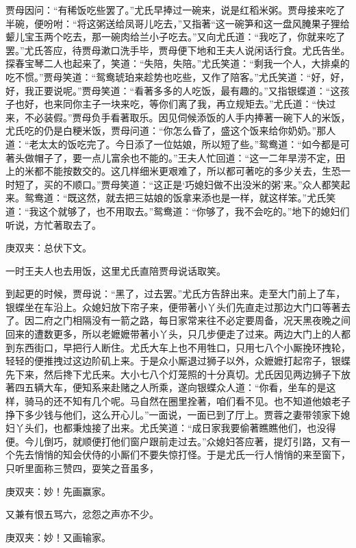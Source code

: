 \begin{parag}
    贾母因问：“有稀饭吃些罢了。”尤氏早捧过一碗来，说是红稻米粥。贾母接来吃了半碗，便吩咐：“将这粥送给凤哥儿吃去，”又指著“这一碗笋和这一盘风腌果子狸给颦儿宝玉两个吃去，那一碗肉给兰小子吃去。”又向尤氏道：“我吃了，你就来吃了罢。”尤氏答应，待贾母漱口洗手毕，贾母便下地和王夫人说闲话行食。尤氏告坐。探春宝琴二人也起来了，笑道：“失陪，失陪。”尤氏笑道：“剩我一个人，大排桌的吃不惯。”贾母笑道：“鸳鸯琥珀来趁势也吃些，又作了陪客。”尤氏笑道：“好，好，好，我正要说呢。”贾母笑道：“看著多多的人吃饭，最有趣的。”又指银蝶道：“这孩子也好，也来同你主子一块来吃，等你们离了我，再立规矩去。”尤氏道：“快过来，不必装假。”贾母负手看著取乐。因见伺候添饭的人手内捧著一碗下人的米饭，尤氏吃的仍是白粳米饭，贾母问道：“你怎么昏了，盛这个饭来给你奶奶。”那人道：“老太太的饭吃完了。今日添了一位姑娘，所以短了些。”鸳鸯道：“如今都是可著头做帽子了，要一点儿富余也不能的。”王夫人忙回道：“这一二年旱涝不定，田上的米都不能按数交的。这几样细米更艰难了，所以都可著吃的多少关去，生恐一时短了，买的不顺口。”贾母笑道：“这正是‘巧媳妇做不出没米的粥’来。”众人都笑起来。鸳鸯道：“既这然，就去把三姑娘的饭拿来添也是一样，就这样笨。”尤氏笑道：“我这个就够了，也不用取去。”鸳鸯道：“你够了，我不会吃的。”地下的媳妇们听说，方忙著取去了。\begin{note}庚双夹：总伏下文。\end{note}一时王夫人也去用饭，这里尤氏直陪贾母说话取笑。
\end{parag}


\begin{parag}
    到起更的时候，贾母说：“黑了，过去罢。”尤氏方告辞出来。走至大门前上了车，银蝶坐在车沿上。众媳妇放下帘子来，便带著小丫头们先直走过那边大门口等著去了。因二府之门相隔没有一箭之路，每日家常来往不必定要周备，况天黑夜晚之间回来的遭数更多，所以老嬷嬷带著小丫头，只几步便走了过来。两边大门上的人都到东西街口，早把行人断住。尤氏大车上也不用牲口，只用七八个小厮挽环拽轮，轻轻的便推拽过这边阶矶上来。于是众小厮退过狮子以外，众嬷嬷打起帘子，银蝶先下来，然后搀下尤氏来。大小七八个灯笼照的十分真切。尤氏因见两边狮子下放著四五辆大车，便知系来赴赌之人所乘，遂向银蝶众人道：“你看，坐车的是这样，骑马的还不知有几个呢。马自然在圈里拴著，咱们看不见。也不知道他娘老子挣下多少钱与他们，这么开心儿。”一面说，一面已到了厅上。贾蓉之妻带领家下媳妇丫头们，也都秉烛接了出来。尤氏笑道：“成日家我要偷著瞧瞧他们，也没得便。今儿倒巧，就顺便打他们窗户跟前走过去。”众媳妇答应著，提灯引路，又有一个先去悄悄的知会伏侍的小厮们不要失惊打怪。于是尤氏一行人悄悄的来至窗下，只听里面称三赞四，耍笑之音虽多，\begin{note}庚双夹：妙！先画赢家。\end{note}又兼有恨五骂六，忿怨之声亦不少。\begin{note}庚双夹：妙！又画输家。\end{note}
\end{parag}


